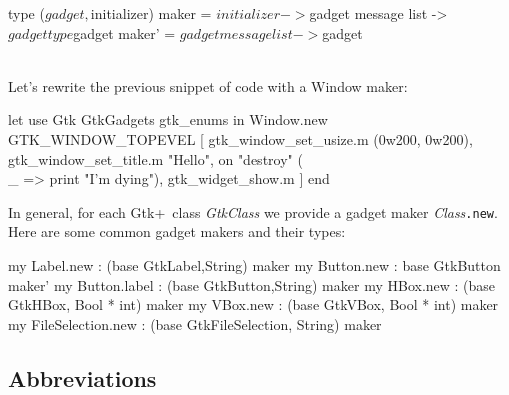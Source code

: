 \documentclass{article}
\newcommand{\gtk}{\mbox{\sf Gtk+}}
\begin{document}
\begin{smldisp}
   type ($gadget,$initializer) maker = 
       $initializer -> $gadget message list -> $gadget 
   type $gadget maker' = $gadget message list -> $gadget
\end{smldisp}

\ \\
Let's rewrite the previous snippet of code with a Window maker:

\begin{smldisp}
   let use Gtk GtkGadgets gtk_enums
   in  Window.new GTK_WINDOW_TOPEVEL
        [ gtk_window_set_usize.m (0w200, 0w200),
          gtk_window_set_title.m "Hello",
          on "destroy" (\\ _ => print "I'm dying"),
          gtk_widget_show.m
        ] 
   end
\end{smldisp}

In general, for each \gtk\ class {\em GtkClass} we provide a gadget
maker {\em Class}\verb|.new|.  Here are some common gadget makers and their
types:

\begin{smldisp}
   my Label.new    : (base GtkLabel,String) maker
   my Button.new   : base GtkButton maker'
   my Button.label : (base GtkButton,String) maker
   my HBox.new     : (base GtkHBox, Bool * int) maker
   my VBox.new     : (base GtkVBox, Bool * int) maker
   my FileSelection.new : (base GtkFileSelection, String) maker
\end{smldisp}

\subsection{Abbreviations}
\end{document}

